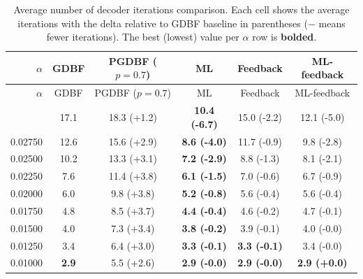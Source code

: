 \setlength{\tabcolsep}{3.2pt}
\renewcommand{\arraystretch}{1.05}
\begin{center}
\scriptsize
\begin{longtable}{r c c c c c}
\caption{Average number of decoder iterations comparison. Each cell shows the average iterations with the delta relative to GDBF baseline in parentheses ($-$ means fewer iterations). The best (lowest) value per $\alpha$ row is \textbf{bolded}.}\label{tab:iter-comparison}\\
\toprule
$\alpha$ & GDBF & PGDBF ($p=0.7$) & ML & Feedback & ML-feedback \\
\midrule
\endfirsthead
\toprule
$\alpha$ & GDBF & PGDBF ($p=0.7$) & ML & Feedback & ML-feedback \\
\midrule
\endhead
\bottomrule
\endfoot
0.03000 & 17.1 & 18.3 (+1.2) & \textbf{10.4 (-6.7)} & 15.0 (-2.2) & 12.1 (-5.0) \\
0.02750 & 12.6 & 15.6 (+2.9) & \textbf{8.6 (-4.0)} & 11.7 (-0.9) & 9.8 (-2.8) \\
0.02500 & 10.2 & 13.3 (+3.1) & \textbf{7.2 (-2.9)} & 8.8 (-1.3) & 8.1 (-2.1) \\
0.02250 & 7.6 & 11.4 (+3.8) & \textbf{6.1 (-1.5)} & 7.0 (-0.6) & 6.7 (-0.9) \\
0.02000 & 6.0 & 9.8 (+3.8) & \textbf{5.2 (-0.8)} & 5.6 (-0.4) & 5.6 (-0.4) \\
0.01750 & 4.8 & 8.5 (+3.7) & \textbf{4.4 (-0.4)} & 4.6 (-0.2) & 4.7 (-0.1) \\
0.01500 & 4.0 & 7.3 (+3.4) & \textbf{3.8 (-0.2)} & 3.9 (-0.1) & 4.0 (-0.0) \\
0.01250 & 3.4 & 6.4 (+3.0) & \textbf{3.3 (-0.1)} & \textbf{3.3 (-0.1)} & 3.4 (-0.0) \\
0.01000 & \textbf{2.9} & 5.5 (+2.6) & \textbf{2.9 (-0.0)} & \textbf{2.9 (-0.0)} & \textbf{2.9 (+0.0)} \\
\end{longtable}
\end{center}

